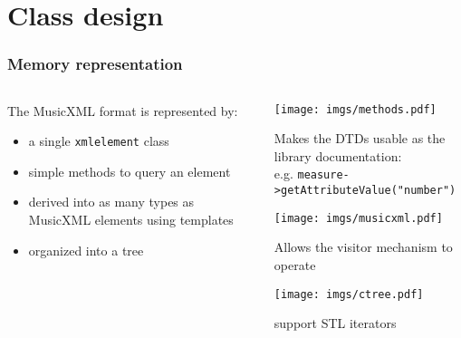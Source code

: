 \documentclass{beamer}
\begin{document}
\section{Class design}
\begin{frame}
  \frametitle{Memory representation}
  \begin{columns}
    \begin{column}[c]{7cm}
    The MusicXML format is represented by:
    {\small
        \begin{itemize}
        \item<1-> a single \texttt{xmlelement} class
        \item<3-> simple methods to query an element
        \item<5-> derived into as many types as MusicXML elements using templates
        \item<7-> organized into a tree
        \end{itemize}}
    \end{column}

    \begin{column}[c]{5cm}
    \begin{overlayarea}{\textwidth}{50mm}
    {\small
       {\vspace{9mm} \texttt{[image: imgs/methods.pdf]}}
      {\vspace{9mm} \begin{block}{}
        Makes the DTDs usable as the library documentation:\\
        e.g. {\tiny \texttt{measure->getAttributeValue("number")}}
        \end{block}}
        {\vspace{12mm}\texttt{[image: imgs/musicxml.pdf]}}
      {\vspace{22mm} \begin{block}{}
        Allows the visitor mechanism to operate
        \end{block}}
       {\vspace{12mm} \texttt{[image: imgs/ctree.pdf]}}
       {\vspace{32mm} \begin{block}{}
        support STL iterators
        \end{block}}
    }
    \end{overlayarea}
    \end{column}
  \end{columns}
\end{frame}
\end{document}
